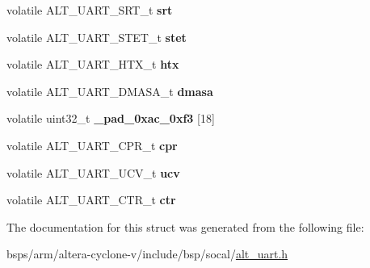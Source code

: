 \begin{DoxyCompactItemize}
\mbox{\label{structALT__UART__s_ac7cd7f358d62b8ade8d6708ba3c8df10}} 
volatile A\+L\+T\+\_\+\+U\+A\+R\+T\+\_\+\+S\+R\+T\+\_\+t {\bfseries srt}
\item 
\mbox{\label{structALT__UART__s_ac2ce7799d4d774ee12914937c20bbeca}} 
volatile A\+L\+T\+\_\+\+U\+A\+R\+T\+\_\+\+S\+T\+E\+T\+\_\+t {\bfseries stet}
\item 
\mbox{\label{structALT__UART__s_a893de3690df7ec0217f2266c0b37efa8}} 
volatile A\+L\+T\+\_\+\+U\+A\+R\+T\+\_\+\+H\+T\+X\+\_\+t {\bfseries htx}
\item 
\mbox{\label{structALT__UART__s_a7240d0b0da4e296cb4c44099a15b5c35}} 
volatile A\+L\+T\+\_\+\+U\+A\+R\+T\+\_\+\+D\+M\+A\+S\+A\+\_\+t {\bfseries dmasa}
\item 
\mbox{\label{structALT__UART__s_a8c88b899ca5c6324750ddc28b90ed477}} 
volatile uint32\+\_\+t {\bfseries \+\_\+pad\+\_\+0xac\+\_\+0xf3} \mbox{[}18\mbox{]}
\item 
\mbox{\label{structALT__UART__s_acd2f5fe16899548dfbd2a2ca2255c6ab}} 
volatile A\+L\+T\+\_\+\+U\+A\+R\+T\+\_\+\+C\+P\+R\+\_\+t {\bfseries cpr}
\item 
\mbox{\label{structALT__UART__s_a6ca3a1c9e77c0d820ecc2151a99c96f7}} 
volatile A\+L\+T\+\_\+\+U\+A\+R\+T\+\_\+\+U\+C\+V\+\_\+t {\bfseries ucv}
\item 
\mbox{\label{structALT__UART__s_a2145cd70efc757a3f5daf5959ebbc312}} 
volatile A\+L\+T\+\_\+\+U\+A\+R\+T\+\_\+\+C\+T\+R\+\_\+t {\bfseries ctr}
\end{DoxyCompactItemize}


The documentation for this struct was generated from the following file\+:\begin{DoxyCompactItemize}
\item 
bsps/arm/altera-\/cyclone-\/v/include/bsp/socal/\mbox{\hyperlink{alt__uart_8h}{alt\+\_\+uart.\+h}}\end{DoxyCompactItemize}

